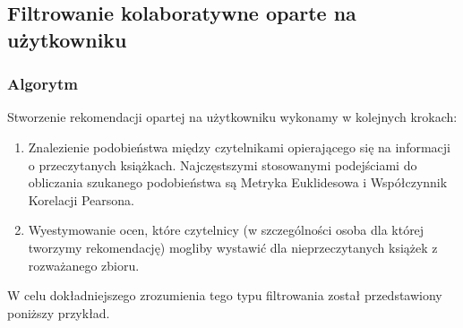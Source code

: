 \documentclass[12pt,a4paper]{report}
\begin{document}
\subsection{Filtrowanie kolaboratywne oparte na użytkowniku}

\subsubsection{Algorytm}
Stworzenie rekomendacji opartej na użytkowniku wykonamy w kolejnych krokach:
\begin{enumerate}
\item Znalezienie podobieństwa między czytelnikami opierającego się na informacji o przeczytanych książkach. Najczęstszymi stosowanymi podejściami do obliczania szukanego podobieństwa są Metryka Euklidesowa i Współczynnik Korelacji Pearsona.
\item Wyestymowanie ocen, które czytelnicy (w szczególności osoba dla której tworzymy rekomendację) mogliby wystawić dla nieprzeczytanych książek z rozważanego zbioru.
\end{enumerate}
W celu dokładniejszego zrozumienia tego typu filtrowania został przedstawiony poniższy przykład.
\end{document}
